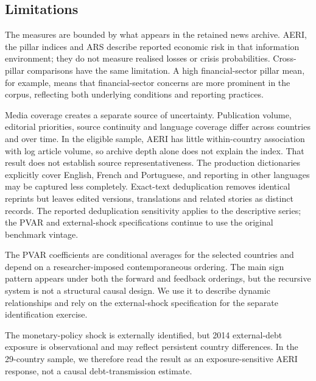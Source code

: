 \documentclass[12pt]{article}
\begin{document}
\subsection{Limitations}\label{sec:limitations}
The measures are bounded by what appears in the retained news archive. AERI, the pillar indices and ARS describe reported economic risk in that information environment; they do not measure realised losses or crisis probabilities. Cross-pillar comparisons have the same limitation. A high financial-sector pillar mean, for example, means that financial-sector concerns are more prominent in the corpus, reflecting both underlying conditions and reporting practices.

Media coverage creates a separate source of uncertainty. Publication volume, editorial priorities, source continuity and language coverage differ across countries and over time. In the eligible sample, AERI has little within-country association with log article volume, so archive depth alone does not explain the index. That result does not establish source representativeness. The production dictionaries explicitly cover English, French and Portuguese, and reporting in other languages may be captured less completely. Exact-text deduplication removes identical reprints but leaves edited versions, translations and related stories as distinct records. The reported deduplication sensitivity applies to the descriptive series; the PVAR and external-shock specifications continue to use the original benchmark vintage.

The PVAR coefficients are conditional averages for the selected countries and depend on a researcher-imposed contemporaneous ordering. The main sign pattern appears under both the forward and feedback orderings, but the recursive system is not a structural causal design. We use it to describe dynamic relationships and rely on the external-shock specification for the separate identification exercise.

The monetary-policy shock is externally identified, but 2014 external-debt exposure is observational and may reflect persistent country differences. In the 29-country sample, we therefore read the result as an exposure-sensitive AERI response, not a causal debt-transmission estimate.
\clearpage
{}
\begingroup
\small
\singlespacing
\printbibliography[heading=none]
\endgroup
\clearpage\appendix
{}
\end{document}
